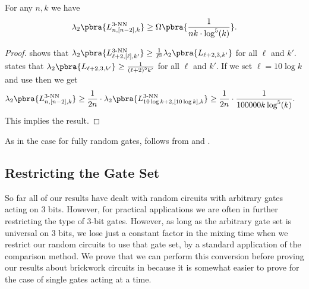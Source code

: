 \begin{corollary}\label{cor:initial spectral gap local}
For any $n,k$ we have
    \begin{align*}
        \lambda_2\pbra{L_{n,[n-2],k}^{3\text{-NN}}}\geq \Omega\pbra{\frac1{nk\cdot\log^5(k)}}.
    \end{align*}
\end{corollary}
\begin{proof}
     shows that $\lambda_2\pbra{L_{\ell+2,[\ell],k'}^{3\text{-NN}}}\geq \frac{1}{\ell^3}\lambda_2\pbra{L_{\ell+2,3,k'}}$ for all $\ell$ and $k'$.  states that $\lambda_2\pbra{L_{\ell+2,3,k'}}\geq \frac{1}{(\ell+2)^2k'}$ for all $\ell$ and $k'$. If we set $\ell=10\log k$ and use  then we get
    \begin{align*}
         &\lambda_2\pbra{L_{n,[n-2],k}^{3\text{-NN}}} 
         \geq \frac{1}{2n}\cdot\lambda_2\pbra{L_{10\log k+2,[10\log k],k}^{3\text{-NN}}}
         \geq  \frac{1}{2n}\cdot\frac1{100000k\log^5(k)}.
    \end{align*}
    This implies the result.
\end{proof}

As in the case for fully random gates,  follows from  and .

\subsection{Restricting the Gate Set}\label{sec:DES gate set}

So far all of our results have dealt with random circuits with arbitrary gates acting on 3 bits. However, for practical applications we are often in further restricting the type of 3-bit gates. However, as long as the arbitrary gate set is universal on 3 bits, we lose just a constant factor in the mixing time when we restrict our random circuits to use that gate set, by a standard application of the comparison method. We prove that we can perform this conversion before proving our results about brickwork circuits in  because it is somewhat easier to prove for the case of single gates acting at a time.

